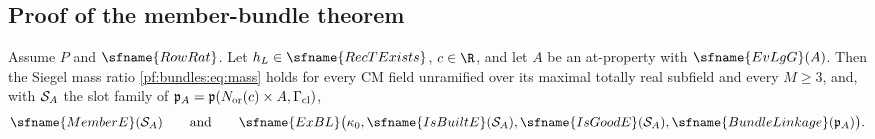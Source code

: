 \subsection{Proof of the member-bundle theorem}\label{pf:bundles:proofmain}

\begin{theorem}\label{pf:bundles:main}
Assume $P$ and $\sfname{RowRat}$. Let $h_L\in\sfname{RecTExists}$, $c\in\R$, and let $A$ be an at-property with $\sfname{EvLgG}(A)$. Then the
Siegel mass ratio \eqref{pf:bundles:eq:mass} holds for every CM field unramified over its maximal totally real subfield and every $M\ge3$, and,
with $\mathcal S_A$ the slot family of $\mathfrak p_A=\mathfrak p(N_{\mathrm{or}}(c)\times A,\Gamma_{\mathrm{cl}})$,
\[
\sfname{MemberE}(\bundS_A)\qquad\text{and}\qquad\sfname{ExBL}\bigl(\kappa_0,\sfname{IsBuiltE}(\bundS_A),\sfname{IsGoodE}(\bundS_A),
\sfname{BundleLinkage}(\bundp_A)\bigr).
\]
\end{theorem}

